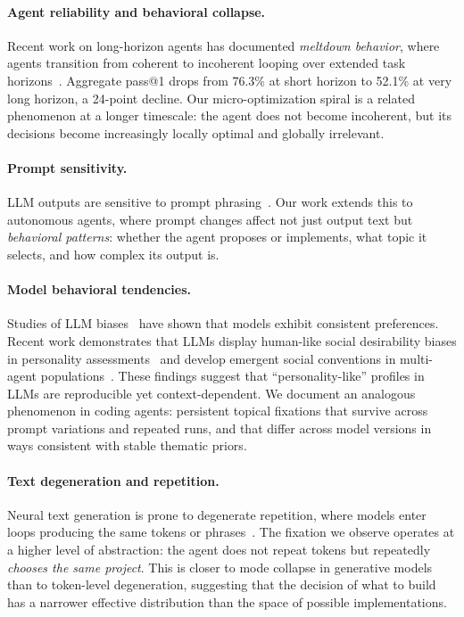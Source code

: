 \documentclass{article}
\begin{document}
\paragraph{Agent reliability and behavioral collapse.}
Recent work on long-horizon agents has documented
\emph{meltdown behavior}, where agents transition from coherent
to incoherent looping over extended task
horizons~\citep{beyondpass2026}. Aggregate pass@1 drops from
76.3\% at short horizon to 52.1\% at very long horizon, a
24-point decline. Our micro-optimization spiral is a related
phenomenon at a longer timescale: the agent does not become
incoherent, but its decisions become increasingly locally optimal
and globally irrelevant.

\paragraph{Prompt sensitivity.}
LLM outputs are sensitive to prompt
phrasing~\citep{lu2022promptorder,zhao2021calibrate}. Our work
extends this to autonomous agents, where prompt changes affect
not just output text but \emph{behavioral patterns}: whether the
agent proposes or implements, what topic it selects, and how
complex its output is.

\paragraph{Model behavioral tendencies.}
Studies of LLM biases~\citep{santurkar2023opinions} have shown that
models exhibit consistent preferences. Recent work demonstrates
that LLMs display human-like social desirability biases in
personality assessments~\citep{simonds2025llmpersonality} and
develop emergent social conventions in multi-agent
populations~\citep{chuang2024emergent}. These findings suggest that
``personality-like'' profiles in LLMs are reproducible yet
context-dependent. We document an analogous phenomenon in coding
agents: persistent topical fixations that survive across prompt
variations and repeated runs, and that differ across model
versions in ways consistent with stable thematic priors.

\paragraph{Text degeneration and repetition.}
Neural text generation is prone to degenerate repetition, where
models enter loops producing the same tokens or
phrases~\citep{holtzman2020curious}. The fixation we observe
operates at a higher level of abstraction: the agent does not
repeat tokens but repeatedly \emph{chooses the same project}.
This is closer to mode collapse in generative models than to
token-level degeneration, suggesting that the decision of what to
build has a narrower effective distribution than the space of
possible implementations.
\end{document}
